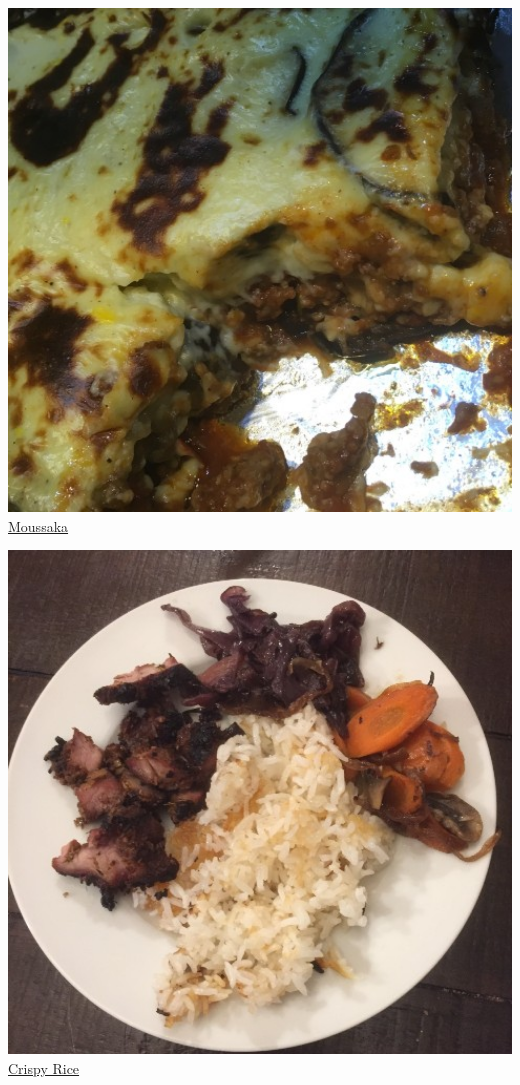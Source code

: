\documentclass[
]{book}
\begin{document}
\protect\hyperlink{moussaka}{\includegraphics[width=1\textwidth,height=\textheight]{moussaka_small.jpg}}
\protect\hyperlink{moussaka}{Moussaka}

\protect\hyperlink{crispyrice}{\includegraphics[width=1\textwidth,height=\textheight]{crispy_rice_small.jpg}}
\protect\hyperlink{crispyrice}{Crispy Rice}
\end{document}
